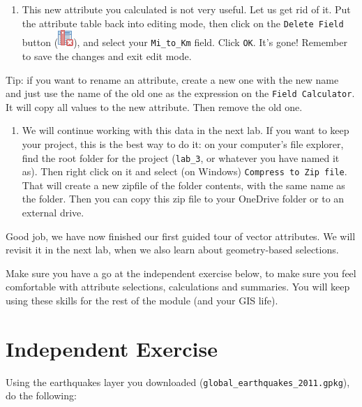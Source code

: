 \documentclass[
  letterpaper,
  DIV=11,
  numbers=noendperiod]{scrreprt}
\providecommand{\tightlist}{%
  \setlength{\itemsep}{0pt}\setlength{\parskip}{0pt}}\usepackage{longtable,booktabs,array}
\begin{document}
\begin{enumerate}
\def\labelenumi{(\arabic{enumi})}
\setcounter{enumi}{100}
\tightlist
\item
  This new attribute you calculated is not very useful. Let us get rid
  of it. Put the attribute table back into editing mode, then click on
  the \texttt{Delete\ Field} button
  (\includegraphics{index_files/mediabag/mActionDeleteAttribu.png}), and
  select your \texttt{Mi\_to\_Km} field. Click \texttt{OK}. It's gone!
  Remember to save the changes and exit edit mode.
\end{enumerate}

Tip: if you want to rename an attribute, create a new one with the new
name and just use the name of the old one as the expression on the
\texttt{Field\ Calculator}. It will copy all values to the new
attribute. Then remove the old one.

\begin{enumerate}
\def\labelenumi{(\arabic{enumi})}
\setcounter{enumi}{101}
\tightlist
\item
  We will continue working with this data in the next lab. If you want
  to keep your project, this is the best way to do it: on your
  computer's file explorer, find the root folder for the project
  (\texttt{lab\_3}, or whatever you have named it as). Then right click
  on it and select (on Windows) \texttt{Compress\ to\ Zip\ file}. That
  will create a new zipfile of the folder contents, with the same name
  as the folder. Then you can copy this zip file to your OneDrive folder
  or to an external drive.
\end{enumerate}

Good job, we have now finished our first guided tour of vector
attributes. We will revisit it in the next lab, when we also learn about
geometry-based selections.

Make sure you have a go at the independent exercise below, to make sure
you feel comfortable with attribute selections, calculations and
summaries. You will keep using these skills for the rest of the module
(and your GIS life).

\section{Independent Exercise}\label{independent-exercise}

Using the earthquakes layer you downloaded
(\texttt{global\_earthquakes\_2011.gpkg}), do the following:
\end{document}
